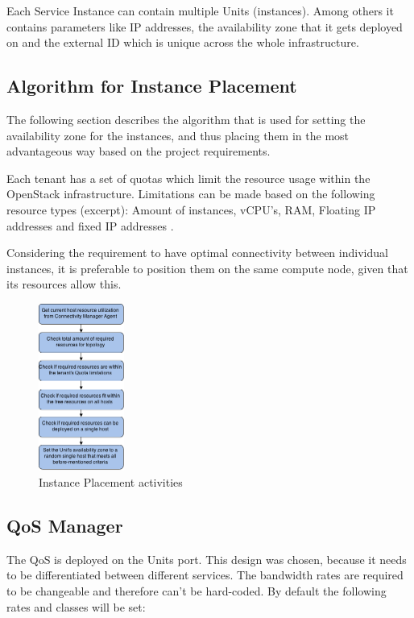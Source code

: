 Each Service Instance can contain multiple Units (instances). Among others it contains parameters like IP addresses, the availability zone that it gets deployed on and the external ID which is unique across the whole infrastructure.



\subsection{Algorithm for Instance Placement}

The following section describes the algorithm that is used for setting the availability zone for the instances, and thus placing them in the most advantageous way based on the project requirements.


Each tenant has a set of quotas which limit the resource usage within the OpenStack infrastructure. Limitations can be made based on the following resource types (excerpt): Amount of instances, vCPU's, RAM, Floating IP addresses and fixed IP addresses \cite{openstack-admin}.

Considering the requirement to have optimal connectivity between individual instances, it is preferable to position them on the same compute node, given that its resources allow this.

\begin{figure}[H]
\centering

\includegraphics[width=0.25\textwidth]{images/design/cm_instance_placement_engine.png}

\caption{Instance Placement activities}
\end{figure}


\subsection{QoS Manager}

The QoS is deployed on the Units port. This design was chosen, because it needs to be differentiated between different services. The bandwidth rates are required to be changeable and therefore can't be hard-coded. By default the following rates and classes will be set:

